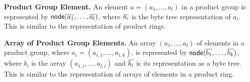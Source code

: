 \item\textbf{Product Group Element.} An element $a=(a_1,\ldots,a_l)$
  in a product group is represented by
  $\textsf{node}(\overline{a_1},\ldots,\overline{a_l})$, where $\overline{a_i}$ is the byte tree
  representation of $a_i$. This is similar to the representation of
  product rings.

\item\textbf{Array of Product Group Elements.} An array
  $(a_1,\ldots,a_l)$ of elements in a product group, where
  $a_i=(a_{i,1},\ldots,a_{i,k})$, is represented by
  $\textsf{node}(\overline{b_1},\ldots,\overline{b_k})$, where $b_i$ is the array
  $(a_{1,i},\ldots,a_{l,i})$ and $\overline{b_i}$ is its representation as a
  byte tree. This is similar to the representation of arrays of
  elements in a product ring.
